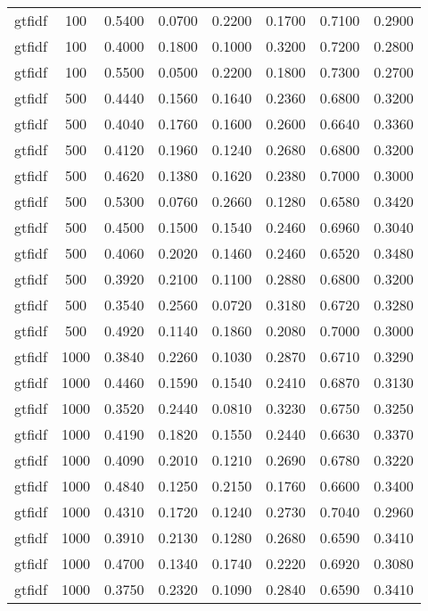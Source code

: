 \begin{scriptsize}
\begin{longtable}{cccccccc}
		gtfidf   & 100  & 0.5400 & 0.0700 & 0.2200 & 0.1700 & 0.7100 & 0.2900 \\
		gtfidf   & 100  & 0.4000 & 0.1800 & 0.1000 & 0.3200 & 0.7200 & 0.2800 \\
		gtfidf   & 100  & 0.5500 & 0.0500 & 0.2200 & 0.1800 & 0.7300 & 0.2700 \\
		gtfidf   & 500  & 0.4440 & 0.1560 & 0.1640 & 0.2360 & 0.6800 & 0.3200 \\
		gtfidf   & 500  & 0.4040 & 0.1760 & 0.1600 & 0.2600 & 0.6640 & 0.3360 \\
		gtfidf   & 500  & 0.4120 & 0.1960 & 0.1240 & 0.2680 & 0.6800 & 0.3200 \\
		gtfidf   & 500  & 0.4620 & 0.1380 & 0.1620 & 0.2380 & 0.7000 & 0.3000 \\
		gtfidf   & 500  & 0.5300 & 0.0760 & 0.2660 & 0.1280 & 0.6580 & 0.3420 \\
		gtfidf   & 500  & 0.4500 & 0.1500 & 0.1540 & 0.2460 & 0.6960 & 0.3040 \\
		gtfidf   & 500  & 0.4060 & 0.2020 & 0.1460 & 0.2460 & 0.6520 & 0.3480 \\
		gtfidf   & 500  & 0.3920 & 0.2100 & 0.1100 & 0.2880 & 0.6800 & 0.3200 \\
		gtfidf   & 500  & 0.3540 & 0.2560 & 0.0720 & 0.3180 & 0.6720 & 0.3280 \\
		gtfidf   & 500  & 0.4920 & 0.1140 & 0.1860 & 0.2080 & 0.7000 & 0.3000 \\
		gtfidf   & 1000 & 0.3840 & 0.2260 & 0.1030 & 0.2870 & 0.6710 & 0.3290 \\
		gtfidf   & 1000 & 0.4460 & 0.1590 & 0.1540 & 0.2410 & 0.6870 & 0.3130 \\
		gtfidf   & 1000 & 0.3520 & 0.2440 & 0.0810 & 0.3230 & 0.6750 & 0.3250 \\
		gtfidf   & 1000 & 0.4190 & 0.1820 & 0.1550 & 0.2440 & 0.6630 & 0.3370 \\
		gtfidf   & 1000 & 0.4090 & 0.2010 & 0.1210 & 0.2690 & 0.6780 & 0.3220 \\
		gtfidf   & 1000 & 0.4840 & 0.1250 & 0.2150 & 0.1760 & 0.6600 & 0.3400 \\
		gtfidf   & 1000 & 0.4310 & 0.1720 & 0.1240 & 0.2730 & 0.7040 & 0.2960 \\
		gtfidf   & 1000 & 0.3910 & 0.2130 & 0.1280 & 0.2680 & 0.6590 & 0.3410 \\
		gtfidf   & 1000 & 0.4700 & 0.1340 & 0.1740 & 0.2220 & 0.6920 & 0.3080 \\
		gtfidf   & 1000 & 0.3750 & 0.2320 & 0.1090 & 0.2840 & 0.6590 & 0.3410 \\

\end{longtable}
\end{scriptsize}
